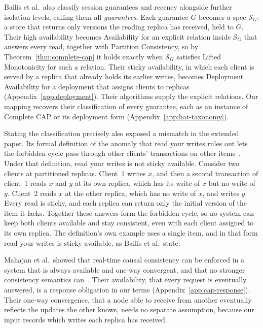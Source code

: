 \documentclass[sigconf]{cidr-2027}
\theoremstyle{remark}
\newcommand{\Spec}{\mathcal{S}}
\begin{document}
Bailis et al.\ also classify session guarantees and recency alongside further
isolation levels, calling them all \emph{guarantees}. Each guarantee $G$
becomes a spec $\Spec_G$: a store that returns only versions the reading
replica has received, held to $G$. Their high availability becomes
Availability for an explicit relation inside $\Spec_G$ that answers every read,
together with Partition Consistency, so by Theorem~\ref{thm:complete-cap} it
holds exactly when $\Spec_G$ satisfies Lifted Monotonicity for such a relation. Their sticky availability, in which each client is served by a replica that
already holds its earlier writes, becomes Deployment Availability for a
deployment that assigns clients to replicas
(Appendix~\ref{app:deployment}). Their algorithms supply the
explicit relations. Our mapping recovers their classification of every
guarantee, each as an instance of Complete CAP or its deployment form
(Appendix~\ref{app:hat-taxonomy}).

Stating the classification precisely also exposed a mismatch in the extended
paper. Its formal definition of the anomaly that read your writes rules out
lets the forbidden cycle pass through other clients' transactions on other
items~\cite[Def.~34]{bailis2013hatextended}. Under that definition, read your
writes is not sticky available. Consider two clients at partitioned replicas. Client~1 writes $x$, and then a second transaction of client~1 reads $x$ and
$y$ at its own replica, which has its write of $x$ but no write of $y$. Client~2 reads $x$ at the other replica, which has no write of $x$, and writes
$y$. Every read is sticky, and each replica can return only the initial
version of the item it lacks. Together these answers form the forbidden
cycle, so no system can keep both clients available and stay consistent, even
with each client assigned to its own replica. The definition's own example
uses a single item, and in that form read your writes is sticky available, as
Bailis et al.\ state.

Mahajan et al.\ showed that real-time causal consistency can be enforced in a
system that is always available and one-way convergent, and that no stronger
consistency semantics can~\cite{mahajan2011consistency}. Their availability,
that every request is eventually answered, is a response obligation in our
terms (Appendix~\ref{app:cap-response}). Their one-way convergence, that a
node able to receive from another eventually reflects the updates the other
knows, needs no separate assumption, because our input records which writes
each replica has received.
\end{document}

